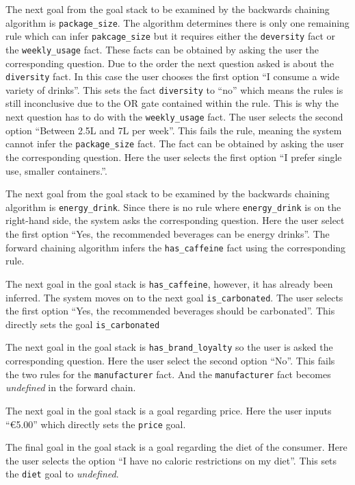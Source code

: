 \documentclass[11pt,a4paper]{article}
\begin{document}
The next goal from the goal stack to be examined by the backwards chaining algorithm is \verb|package_size|. The algorithm determines there is only one remaining rule which can infer \verb|pakcage_size| but it requires either the \verb|deversity| fact or the \verb|weekly_usage| fact. These facts can be obtained by asking the user the corresponding question. Due to the order the next question asked is about the \verb|diversity| fact. In this case the user chooses the first option ``I consume a wide variety of drinks''. This sets the fact \verb|diversity| to ``no'' which means the rules is still inconclusive due to the OR gate contained within the rule. This is why the next question has to do with the \verb|weekly_usage| fact. The user selects the second option ``Between 2.5L and 7L per week''. This fails the rule, meaning the system cannot infer the \verb|package_size| fact. The fact can be obtained by asking the user the corresponding question. Here the user selects the first option ``I prefer single use, smaller containers.''.

The next goal from the goal stack to be examined by the backwards chaining algorithm is \verb|energy_drink|. Since there is no rule where \verb|energy_drink| is on the right-hand side, the system asks the corresponding question. Here the user select the first option ``Yes, the recommended beverages can be energy drinks''. The forward chaining algorithm infers the \verb|has_caffeine| fact using the corresponding rule.

The next goal in the goal stack is \verb|has_caffeine|, however, it has already been inferred. The system moves on to the next goal \verb|is_carbonated|. The user selects the first option ``Yes, the recommended beverages should be carbonated''. This directly sets the goal \verb|is_carbonated|

The next goal in the goal stack is \verb|has_brand_loyalty| so the user is asked the corresponding question. Here the user select the second option ``No''. This fails the two rules for the \verb|manufacturer| fact. And the \verb|manufacturer| fact becomes \textit{undefined} in the forward chain.

The next goal in the goal stack is a goal regarding price. Here the user inputs ``\euro 5.00'' which directly sets the \verb|price| goal.

The final goal in the goal stack is a goal regarding the diet of the consumer. Here the user selects the option ``I have no caloric restrictions on my diet''. This sets the \verb|diet| goal to \textit{undefined}.
\end{document}
